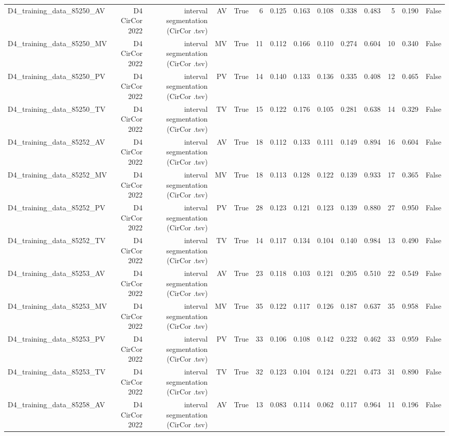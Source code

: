 \begin{table}[htbp]
\begin{tabular}{lrrrrrrrrrrrrr}
    D4\_training\_data\_85250\_AV & D4 CirCor 2022 & interval segmentation (CirCor .tsv) & AV & True & 6 & 0.125 & 0.163 & 0.108 & 0.338 & 0.483 & 5 & 0.190 & False \\
    D4\_training\_data\_85250\_MV & D4 CirCor 2022 & interval segmentation (CirCor .tsv) & MV & True & 11 & 0.112 & 0.166 & 0.110 & 0.274 & 0.604 & 10 & 0.340 & False \\
    D4\_training\_data\_85250\_PV & D4 CirCor 2022 & interval segmentation (CirCor .tsv) & PV & True & 14 & 0.140 & 0.133 & 0.136 & 0.335 & 0.408 & 12 & 0.465 & False \\
    D4\_training\_data\_85250\_TV & D4 CirCor 2022 & interval segmentation (CirCor .tsv) & TV & True & 15 & 0.122 & 0.176 & 0.105 & 0.281 & 0.638 & 14 & 0.329 & False \\
    D4\_training\_data\_85252\_AV & D4 CirCor 2022 & interval segmentation (CirCor .tsv) & AV & True & 18 & 0.112 & 0.133 & 0.111 & 0.149 & 0.894 & 16 & 0.604 & False \\
    D4\_training\_data\_85252\_MV & D4 CirCor 2022 & interval segmentation (CirCor .tsv) & MV & True & 18 & 0.113 & 0.128 & 0.122 & 0.139 & 0.933 & 17 & 0.365 & False \\
    D4\_training\_data\_85252\_PV & D4 CirCor 2022 & interval segmentation (CirCor .tsv) & PV & True & 28 & 0.123 & 0.121 & 0.123 & 0.139 & 0.880 & 27 & 0.950 & False \\
    D4\_training\_data\_85252\_TV & D4 CirCor 2022 & interval segmentation (CirCor .tsv) & TV & True & 14 & 0.117 & 0.134 & 0.104 & 0.140 & 0.984 & 13 & 0.490 & False \\
    D4\_training\_data\_85253\_AV & D4 CirCor 2022 & interval segmentation (CirCor .tsv) & AV & True & 23 & 0.118 & 0.103 & 0.121 & 0.205 & 0.510 & 22 & 0.549 & False \\
    D4\_training\_data\_85253\_MV & D4 CirCor 2022 & interval segmentation (CirCor .tsv) & MV & True & 35 & 0.122 & 0.117 & 0.126 & 0.187 & 0.637 & 35 & 0.958 & False \\
    D4\_training\_data\_85253\_PV & D4 CirCor 2022 & interval segmentation (CirCor .tsv) & PV & True & 33 & 0.106 & 0.108 & 0.142 & 0.232 & 0.462 & 33 & 0.959 & False \\
    D4\_training\_data\_85253\_TV & D4 CirCor 2022 & interval segmentation (CirCor .tsv) & TV & True & 32 & 0.123 & 0.104 & 0.124 & 0.221 & 0.473 & 31 & 0.890 & False \\
    D4\_training\_data\_85258\_AV & D4 CirCor 2022 & interval segmentation (CirCor .tsv) & AV & True & 13 & 0.083 & 0.114 & 0.062 & 0.117 & 0.964 & 11 & 0.196 & False \\

\end{tabular}
\end{table}
